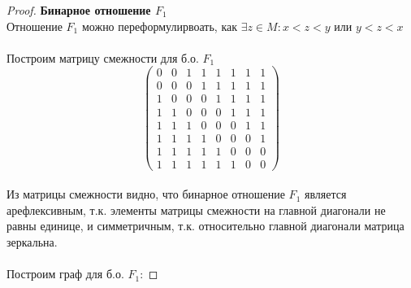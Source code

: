 \pagebreak
\begin{proof} \textbf{Бинарное отношение $F_1$}\\
Отношение $F_1$ можно переформулирвоать, как $\exists z \in M: x < z < y \text{ или } y < z < x$
\\ \\
Построим матрицу смежности для б.о. $F_1$
$$ \left( \begin{array}{cccccccc}
		   0 &0 &1 &1 &1 &1 &1 &1 
        \\0 &0 &0 &1 &1 &1 &1 &1
        \\1 &0 &0 &0 &1 &1 &1 &1
        \\1 &1 &0 &0 &0 &1 &1 &1
        \\1 &1 &1 &0 &0 &0 &1 &1
        \\1 &1 &1 &1 &0 &0 &0 &1
        \\1 &1 &1 &1 &1 &0 &0 &0
        \\1 &1 &1 &1 &1 &1 &0 &0 \end{array} \right) $$\\
Из матрицы смежности видно, что бинарное отношение $F_1$ является арефлексивным, т.к. элементы матрицы смежности на главной диагонали не равны единице, и симметричным, т.к. относительно главной диагонали матрица зеркальна.
\\ \\
Построим граф для б.о. $F_1$:


\end{proof}
